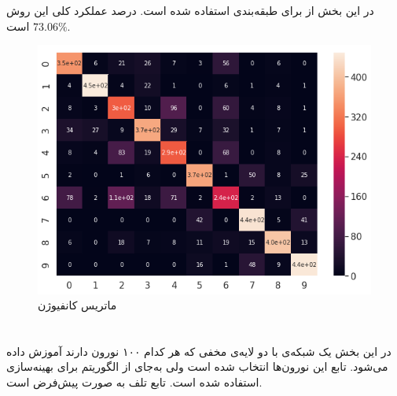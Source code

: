 \documentclass[a4paper]{article}
\begin{document}
\begin{large}
\newpage
\section{}
در این بخش از 
برای طبقه‌بندی استفاده شده است. درصد عملکرد کلی این روش
$73.06\%$
است.

\begin{figure}[h!]
	\centering
	\includegraphics[scale=0.6]{DT.png}
	\caption{ماتریس کانفیوژن 
	}
\end{figure}

\newpage
\section{}
در این بخش یک شبکه‌ی 
با دو لایه‌ی مخفی که هر کدام ۱۰۰ نورون دارند آموزش داده‌ می‌شود. تابع 
این نورون‌ها 
 انتخاب شده است ولی به‌جای 
 از الگوریتم 
 برای بهینه‌سازی استفاده شده است. تابع تلف به صورت پیش‌فرض
 است.


\end{large}
\end{document}

